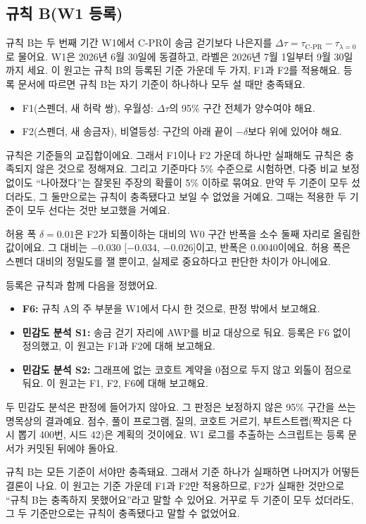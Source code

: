 \subsection{규칙 B(W1 등록)}
\label{sec:rule-b}

규칙 B는 두 번째 기간 W1에서 C-PR이 송금 걷기보다 나은지를 $\Delta\tau=\tau_{\text{C-PR}}-\tau_{\lambda=0}$로 물어요. W1은 2026년 6월 30일에 동결하고, 라벨은 2026년 7월 1일부터 9월 30일까지 세요. 이 원고는 규칙 B의 등록된 기준 가운데 두 가지, F1과 F2를 적용해요. 등록 문서에 따르면 규칙 B는 자기 기준이 하나하나 모두 설 때만 충족돼요.
\begin{itemize}
\item F1(스펜더, 새 허락 쌍), 우월성: $\Delta\tau$의 95\% 구간 전체가 양수여야 해요.
\item F2(스펜더, 새 송금자), 비열등성: 구간의 아래 끝이 $-\delta$보다 위에 있어야 해요.
\end{itemize}
규칙은 기준들의 교집합이에요. 그래서 F1이나 F2 가운데 하나만 실패해도 규칙은 충족되지 않은 것으로 정해져요. 그리고 기준마다 5\% 수준으로 시험하면, 다중 비교 보정 없이도 “나아졌다”는 잘못된 주장의 확률이 5\% 이하로 묶여요. 만약 두 기준이 모두 섰더라도, 그 둘만으로는 규칙이 충족됐다고 보일 수 없었을 거예요. 그때는 적용한 두 기준이 모두 선다는 것만 보고했을 거예요.

허용 폭 $\delta=0.01$은 F2가 되풀이하는 대비의 W0 구간 반폭을 소수 둘째 자리로 올림한 값이에요. 그 대비는 −0.030 [−0.034, −0.026]이고, 반폭은 0.0040이에요. 허용 폭은 스펜더 대비의 정밀도를 잴 뿐이고, 실제로 중요하다고 판단한 차이가 아니에요.

등록은 규칙과 함께 다음을 정했어요.
\begin{itemize}
\item \textbf{F6:} 규칙 A의 주 부분을 W1에서 다시 한 것으로, 판정 밖에서 보고해요.
\item \textbf{민감도 분석 S1:} 송금 걷기 자리에 AWP를 비교 대상으로 둬요. 등록은 F6 없이 정의했고, 이 원고는 F1과 F2에 대해 보고해요.
\item \textbf{민감도 분석 S2:} 그래프에 없는 코호트 계약을 0점으로 두지 않고 외톨이 점으로 둬요. 이 원고는 F1, F2, F6에 대해 보고해요.
\end{itemize}
두 민감도 분석은 판정에 들어가지 않아요. 그 판정은 보정하지 않은 95\% 구간을 쓰는 명목상의 결과예요. 점수, 풀이 프로그램, 질의, 코호트 거르기, 부트스트랩(짝지은 다시 뽑기 400번, 시드 42)은 계획의 것이에요. W1 로그를 추출하는 스크립트는 등록 문서가 커밋된 뒤에야 돌아요.

\begin{puri}
규칙 B는 모든 기준이 서야만 충족돼요. 그래서 기준 하나가 실패하면 나머지가 어떻든 결론이 나요. 이 원고는 기준 가운데 F1과 F2만 적용하므로, F2가 실패한 것만으로 “규칙 B는 충족하지 못했어요”라고 말할 수 있어요. 거꾸로 두 기준이 모두 섰더라도, 그 두 기준만으로는 규칙이 충족됐다고 말할 수 없었어요.
\end{puri}

